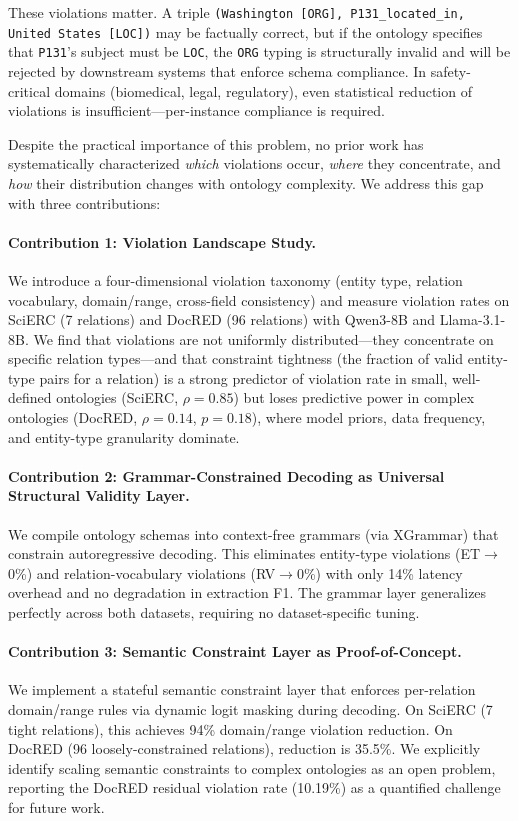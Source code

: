 \documentclass[11pt,a4paper]{article}
\begin{document}
These violations matter.
A triple \texttt{(Washington [ORG], P131\_located\_in, United States [LOC])} may be factually correct, but if the ontology specifies that \texttt{P131}'s subject must be \texttt{LOC}, the \texttt{ORG} typing is structurally invalid and will be rejected by downstream systems that enforce schema compliance.
In safety-critical domains (biomedical, legal, regulatory), even statistical reduction of violations is insufficient---per-instance compliance is required.

Despite the practical importance of this problem, no prior work has systematically characterized \emph{which} violations occur, \emph{where} they concentrate, and \emph{how} their distribution changes with ontology complexity.
We address this gap with three contributions:

\paragraph{Contribution 1: Violation Landscape Study.}
We introduce a four-dimensional violation taxonomy (entity type, relation vocabulary, domain/range, cross-field consistency) and measure violation rates on SciERC (7 relations) and DocRED (96 relations) with Qwen3-8B and Llama-3.1-8B.
We find that violations are not uniformly distributed---they concentrate on specific relation types---and that constraint tightness (the fraction of valid entity-type pairs for a relation) is a strong predictor of violation rate in small, well-defined ontologies (SciERC, $\rho{=}0.85$) but loses predictive power in complex ontologies (DocRED, $\rho{=}0.14$, $p{=}0.18$), where model priors, data frequency, and entity-type granularity dominate.

\paragraph{Contribution 2: Grammar-Constrained Decoding as Universal Structural Validity Layer.}
We compile ontology schemas into context-free grammars (via XGrammar) that constrain autoregressive decoding.
This eliminates entity-type violations (ET${\to}$0\%) and relation-vocabulary violations (RV${\to}$0\%) with only 14\% latency overhead and no degradation in extraction F1.
The grammar layer generalizes perfectly across both datasets, requiring no dataset-specific tuning.

\paragraph{Contribution 3: Semantic Constraint Layer as Proof-of-Concept.}
We implement a stateful semantic constraint layer that enforces per-relation domain/range rules via dynamic logit masking during decoding.
On SciERC (7 tight relations), this achieves 94\% domain/range violation reduction.
On DocRED (96 loosely-constrained relations), reduction is 35.5\%.
We explicitly identify scaling semantic constraints to complex ontologies as an open problem, reporting the DocRED residual violation rate (10.19\%) as a quantified challenge for future work.
\end{document}
